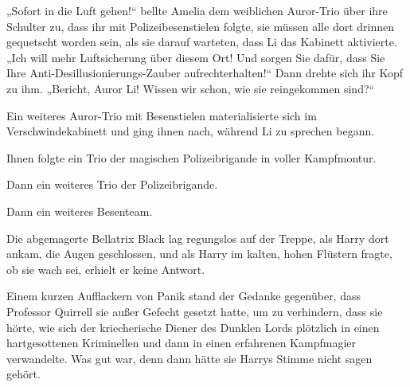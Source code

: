 „Sofort in die Luft gehen!“ bellte Amelia dem weiblichen Auror-Trio über ihre Schulter zu, dass ihr mit Polizeibesenstielen folgte, sie müssen alle dort drinnen gequetscht worden sein, als sie darauf warteten, dass Li das Kabinett aktivierte.
„Ich will mehr Luftsicherung über diesem Ort! Und sorgen Sie dafür, dass Sie Ihre Anti-Desillusionierungs-Zauber aufrechterhalten!“ Dann drehte sich ihr Kopf zu ihm.
„Bericht, Auror Li! Wissen wir schon, wie sie reingekommen sind?“

Ein weiteres Auror-Trio mit Besenstielen materialisierte sich im Verschwindekabinett und ging ihnen nach, während Li zu sprechen begann.

Ihnen folgte ein Trio der magischen Polizeibrigande in voller Kampfmontur.

Dann ein weiteres Trio der Polizeibrigande.

Dann ein weiteres Besenteam.

\later

Die abgemagerte Bellatrix Black lag regungslos auf der Treppe, als Harry dort ankam, die Augen geschlossen, und als Harry im kalten, hohen Flüstern fragte, ob sie wach sei, erhielt er keine Antwort.

Einem kurzen Aufflackern von Panik stand der Gedanke gegenüber, dass Professor Quirrell sie außer Gefecht gesetzt hatte, um zu verhindern, dass sie hörte, wie sich der kriecherische Diener des Dunklen Lords plötzlich in einen hartgesottenen Kriminellen und dann in einen erfahrenen Kampfmagier verwandelte. Was gut war, denn dann hätte sie Harrys Stimme nicht  sagen gehört.

